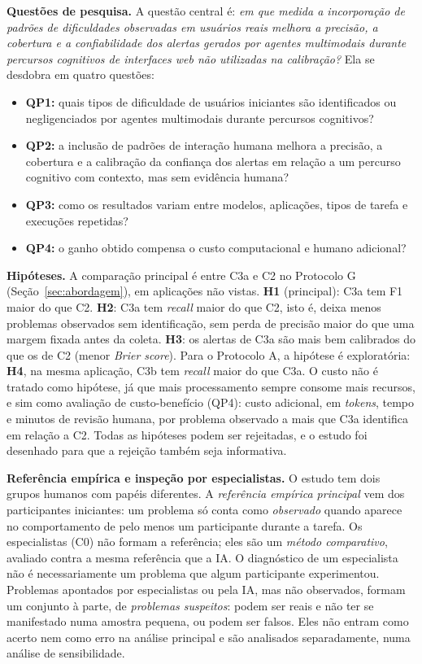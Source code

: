 \documentclass[12pt]{article}
\begin{document}
\textbf{Questões de pesquisa.} A questão central é: \textit{em que medida a incorporação de padrões de dificuldades observadas em usuários reais melhora a precisão, a cobertura e a confiabilidade dos alertas gerados por agentes multimodais durante percursos cognitivos de interfaces web não utilizadas na calibração?} Ela se desdobra em quatro questões:
\begin{itemize}[noitemsep, topsep=3pt, leftmargin=1.5em]
  \item \textbf{QP1:} quais tipos de dificuldade de usuários iniciantes são identificados ou negligenciados por agentes multimodais durante percursos cognitivos?
  \item \textbf{QP2:} a inclusão de padrões de interação humana melhora a precisão, a cobertura e a calibração da confiança dos alertas em relação a um percurso cognitivo com contexto, mas sem evidência humana?
  \item \textbf{QP3:} como os resultados variam entre modelos, aplicações, tipos de tarefa e execuções repetidas?
  \item \textbf{QP4:} o ganho obtido compensa o custo computacional e humano adicional?
\end{itemize}

\textbf{Hipóteses.} A comparação principal é entre C3a e C2 no Protocolo G (Seção~\ref{sec:abordagem}), em aplicações não vistas. \textbf{H1} (principal): C3a tem F1 maior do que C2. \textbf{H2}: C3a tem \textit{recall} maior do que C2, isto é, deixa menos problemas observados sem identificação, sem perda de precisão maior do que uma margem fixada antes da coleta. \textbf{H3}: os alertas de C3a são mais bem calibrados do que os de C2 (menor \textit{Brier score}). Para o Protocolo A, a hipótese é exploratória: \textbf{H4}, na mesma aplicação, C3b tem \textit{recall} maior do que C3a. O custo não é tratado como hipótese, já que mais processamento sempre consome mais recursos, e sim como avaliação de custo-benefício (QP4): custo adicional, em \textit{tokens}, tempo e minutos de revisão humana, por problema observado a mais que C3a identifica em relação a C2. Todas as hipóteses podem ser rejeitadas, e o estudo foi desenhado para que a rejeição também seja informativa.

\textbf{Referência empírica e inspeção por especialistas.} O estudo tem dois grupos humanos com papéis diferentes. A \textit{referência empírica principal} vem dos participantes iniciantes: um problema só conta como \textit{observado} quando aparece no comportamento de pelo menos um participante durante a tarefa. Os especialistas (C0) não formam a referência; eles são um \textit{método comparativo}, avaliado contra a mesma referência que a IA. O diagnóstico de um especialista não é necessariamente um problema que algum participante experimentou. Problemas apontados por especialistas ou pela IA, mas não observados, formam um conjunto à parte, de \textit{problemas suspeitos}: podem ser reais e não ter se manifestado numa amostra pequena, ou podem ser falsos. Eles não entram como acerto nem como erro na análise principal e são analisados separadamente, numa análise de sensibilidade.
\end{document}
